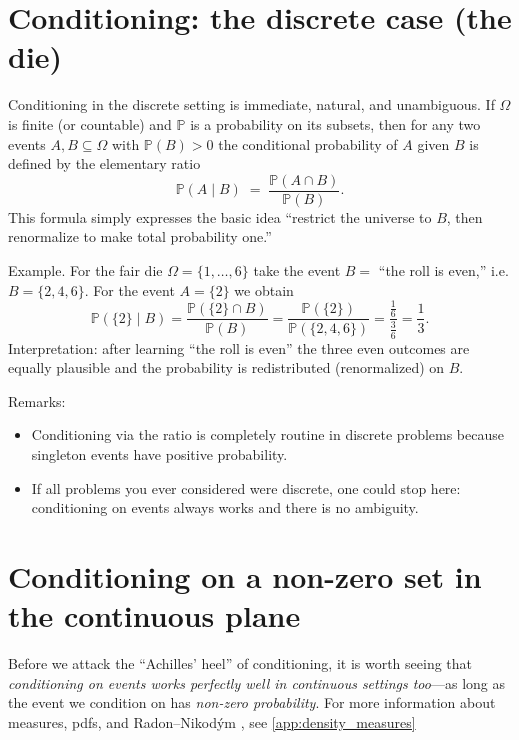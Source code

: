 \documentclass[11pt]{article}
\theoremstyle{remark}
\begin{document}
\section{Conditioning: the discrete case (the die)}

Conditioning in the discrete setting is immediate, natural, and unambiguous.
If \(\Omega\) is finite (or countable) and \(\mathbb{P}\) is a probability on its subsets,
then for any two events \(A,B\subseteq\Omega\) with \(\mathbb{P}(B)>0\) the
conditional probability of \(A\) given \(B\) is defined by the elementary ratio
\[
\mathbb{P}(A\mid B) \;=\; \frac{\mathbb{P}(A\cap B)}{\mathbb{P}(B)} .
\]
This formula simply expresses the basic idea ``restrict the universe to \(B\),
then renormalize to make total probability one.''

Example. For the fair die \(\Omega=\{1,\dots,6\}\) take the event \(B=\) ``the roll is even,''
i.e. \(B=\{2,4,6\}\). For the event \(A=\{2\}\) we obtain
\[
\mathbb{P}(\{2\}\mid B)=\frac{\mathbb{P}(\{2\}\cap B)}{\mathbb{P}(B)}
=\frac{\mathbb{P}(\{2\})}{\mathbb{P}(\{2,4,6\})}
=\frac{\tfrac{1}{6}}{\tfrac{3}{6}} = \frac{1}{3}.
\]
Interpretation: after learning ``the roll is even'' the three even outcomes are
equally plausible and the probability is redistributed (renormalized) on \(B\).

Remarks:
\begin{itemize}
\item Conditioning via the ratio is completely routine in discrete problems because
      singleton events have positive probability.
\item If all problems you ever considered were discrete, one could stop here: conditioning
      on events always works and there is no ambiguity.
\end{itemize}


\section{Conditioning on a non-zero set in the continuous plane}

Before we attack the ``Achilles' heel'' of conditioning, it is worth seeing that
\emph{conditioning on events works perfectly well in continuous settings too}---as long as
the event we condition on has \emph{non-zero probability}. For more information about measures, pdfs, and Radon--Nikod\'ym , see \ref{app:density_measures}
\end{document}
